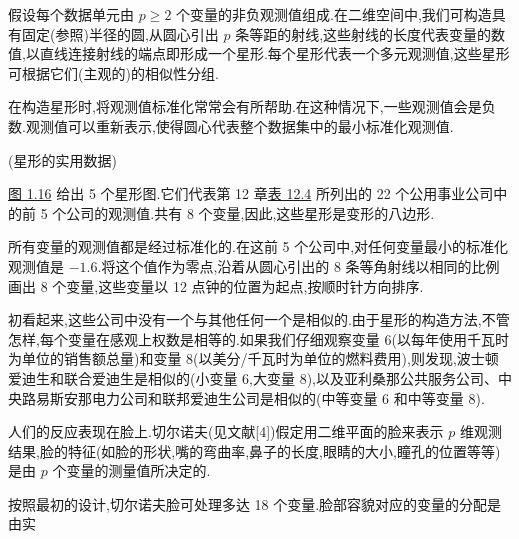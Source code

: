 
\begin{mvfigure}
\label{fig:1.15}
\end{mvfigure}


假设每个数据单元由 $p\geqslant 2$ 个变量的非负观测值组成.在二维空间中,我们可构造具有固定(参照)半径的圆,从圆心引出 $p$ 条等距的射线,这些射线的长度代表变量的数值,以直线连接射线的端点即形成一个星形.每个星形代表一个多元观测值,这些星形可根据它们(主观的)的相似性分组.

在构造星形时,将观测值标准化常常会有所帮助.在这种情况下,一些观测值会是负数.观测值可以重新表示,使得圆心代表整个数据集中的最小标准化观测值.

\quad(星形的实用数据)

\hyperref[fig:1.16]{图 1.16} 给出 5 个星形图.它们代表第 12 章\hyperref[tab:12.4]{表 12.4} 所列出的 22 个公用事业公司中的前 5 个公司的观测值.共有 8 个变量,因此,这些星形是变形的八边形.

所有变量的观测值都是经过标准化的.在这前 5 个公司中,对任何变量最小的标准化观测值是 $-1.6$.将这个值作为零点,沿着从圆心引出的 8 条等角射线以相同的比例画出 8 个变量,这些变量以 12 点钟的位置为起点,按顺时针方向排序.

初看起来,这些公司中没有一个与其他任何一个是相似的.由于星形的构造方法,不管怎样,每个变量在感观上权数是相等的.如果我们仔细观察变量 6(以每年使用千瓦时为单位的销售额总量)和变量 8(以美分/千瓦时为单位的燃料费用),则发现,波士顿爱迪生和联合爱迪生是相似的(小变量 6,大变量 8),以及亚利桑那公共服务公司、中央路易斯安那电力公司和联邦爱迪生公司是相似的(中等变量 6 和中等变量 8).


人们的反应表现在脸上.切尔诺夫(见文献[4])假定用二维平面的脸来表示 $p$ 维观测结果,脸的特征(如脸的形状,嘴的弯曲率,鼻子的长度,眼睛的大小,瞳孔的位置等等)是由 $p$ 个变量的测量值所决定的.

按照最初的设计,切尔诺夫脸可处理多达 18 个变量.脸部容貌对应的变量的分配是由实%
